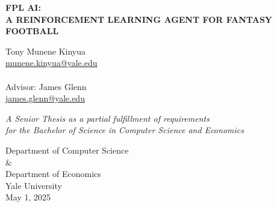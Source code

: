 \begin{titlepage}
    \begin{center}
        \vspace*{1cm}
        
        \huge
        \textbf{FPL AI: \\
        A REINFORCEMENT LEARNING AGENT FOR FANTASY FOOTBALL}
        
        \vspace{0.5cm}
        \LARGE
        
        \vspace{1cm}

        \Large
        Tony Munene Kinyua\\
        \href{munene.kinyua@yale.edu}{munene.kinyua@yale.edu}\\~\\
        Advisor: James Glenn\\
        \href{james.glenn@yale.edu}{james.glenn@yale.edu}
        
        \vfill
        
        \textit{A Senior Thesis as a partial fulfillment
        of requirements \\for the Bachelor of Science in Computer Science and Economics}
        
        \vspace{0.8cm}
        
        \Large
        Department of Computer Science\\
        \&\\
        Department of Economics\\
        Yale University\\
        May 1, 2025
        
    \end{center}
\end{titlepage}